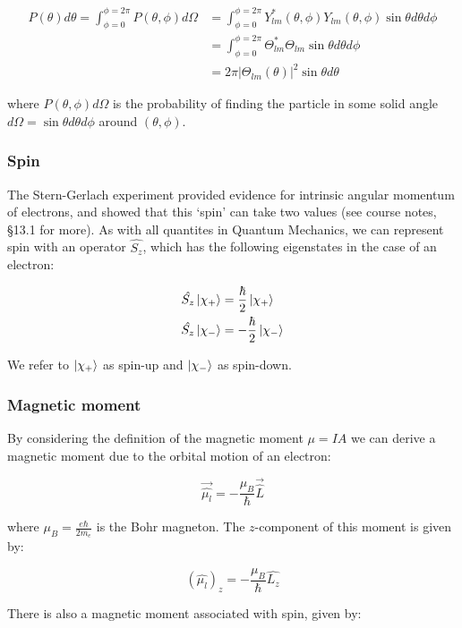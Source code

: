 \begin{align*} 
P(\theta)d\theta = \int_{\phi=0}^{\phi=2\pi} P(\theta, \phi) d\Omega &= \int_{\phi=0}^{\phi=2\pi} Y^*_{lm}(\theta, \phi) Y_{lm}(\theta, \phi) \sin{\theta} d\theta d\phi \\
&= \int_{\phi=0}^{\phi=2\pi} \Theta_{lm}^* \Theta_{lm} \sin{\theta} d\theta d\phi \\
&= 2\pi \left| \Theta_{lm}(\theta)\right|^2 \sin{\theta} d\theta
\end{align*}

where $P(\theta, \phi) d\Omega$ is the probability of finding the particle in some solid angle $d\Omega = \sin{\theta} d\theta d\phi$ around $(\theta, \phi)$.

\subsubsection*{Spin}

The Stern-Gerlach experiment provided evidence for intrinsic angular momentum of electrons, and showed that this `spin' can take two values (see course notes, §13.1 for more). As with all quantites in Quantum Mechanics, we can represent spin with an operator $\hat{S_z}$, which has the following eigenstates in the case of an electron:

\begin{align*}
\hat{S_z}\ket{\chi_+} &= \frac{\hbar}{2}\ket{\chi_+} \\
\hat{S_z}\ket{\chi_-} &=  -\frac{\hbar}{2}\ket{\chi_-}
\end{align*}

We refer to $\ket{\chi_+}$ as spin-up and $\ket{\chi_-}$ as spin-down.

\subsubsection*{Magnetic moment}

By considering the definition of the magnetic moment $\mu = IA$ we can derive a magnetic moment due to the orbital motion of an electron:

\[ \vec{\hat{\mu_l}} = -\frac{\mu_B}{\hbar} \vec{\hat{L}} \]

where $\mu_B = \frac{e\hbar}{2m_e}$ is the Bohr magneton. The $z$-component of this moment is given by:

\[ (\hat{\mu_l})_z = -\frac{\mu_B}{\hbar} \hat{L_z} \]

There is also a magnetic moment associated with spin, given by:

